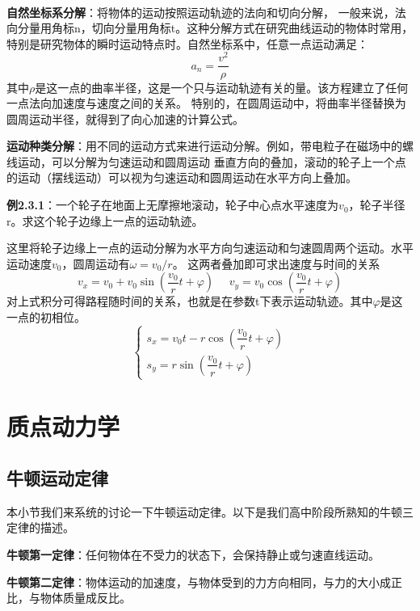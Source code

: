\documentclass{article}
\begin{document}
    \ 

    \textbf{自然坐标系分解}：将物体的运动按照运动轨迹的法向和切向分解，
    一般来说，法向分量用角标n，切向分量用角标t。这种分解方式在研究曲线运动的物体时常用，
    特别是研究物体的瞬时运动特点时。自然坐标系中，任意一点运动满足：
    \begin{equation*}
        a_n = \frac{v^2}{\rho}
    \end{equation*}
    其中\(\rho\)是这一点的曲率半径，这是一个只与运动轨迹有关的量。该方程建立了任何一点法向加速度与速度之间的关系。
    特别的，在圆周运动中，将曲率半径替换为圆周运动半径，就得到了向心加速的计算公式。
    
    \textbf{运动种类分解}：用不同的运动方式来进行运动分解。例如，带电粒子在磁场中的螺线运动，可以分解为匀速运动和圆周运动
    垂直方向的叠加，滚动的轮子上一个点的运动（摆线运动）可以视为匀速运动和圆周运动在水平方向上叠加。

    \textbf{例2.3.1}：一个轮子在地面上无摩擦地滚动，轮子中心点水平速度为\(v_0\)，轮子半径r。求这个轮子边缘上一点的运动轨迹。

    这里将轮子边缘上一点的运动分解为水平方向匀速运动和匀速圆周两个运动。水平运动速度\(v_0\)，圆周运动有\(\omega = v_0/r\)。
    这两者叠加即可求出速度与时间的关系
    \begin{equation*}
        v_x = v_0 + v_0 \sin(\frac{v_0}{r}t + \varphi) \ \ \ \ \ \ v_y = v_0 \cos(\frac{v_0}{r}t + \varphi)
    \end{equation*}
    对上式积分可得路程随时间的关系，也就是在参数t下表示运动轨迹。其中\(\varphi\)是这一点的初相位。
    \[
    \begin{cases}
        s_x = v_0 t - r \cos(\dfrac{v_0}{r}t + \varphi) \\
        s_y = r \sin(\dfrac{v_0}{r}t + \varphi)
    \end{cases}
    \]
    
\section{质点动力学}

    \subsection{牛顿运动定律}
    本小节我们来系统的讨论一下牛顿运动定律。以下是我们高中阶段所熟知的牛顿三定律的描述。

    \textbf{牛顿第一定律}：任何物体在不受力的状态下，会保持静止或匀速直线运动。

    \textbf{牛顿第二定律}：物体运动的加速度，与物体受到的力方向相同，与力的大小成正比，与物体质量成反比。
\end{document}
